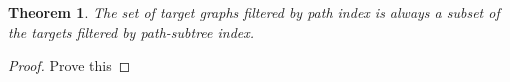 \documentclass{l4proj}
\newcounter{example}[section]
\newtheorem{theorem}{Theorem}[section]
\begin{document}
\begin{theorem}
The set of target graphs filtered by path index is always a subset of the targets filtered by path-subtree index.
\end{theorem}

\begin{proof}
Prove this

\end{proof}
\end{document}

